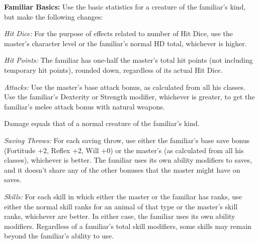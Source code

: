 \textbf{Familiar Basics:} Use the basic statistics for a creature of the familiar's kind, but make the following changes:

\textit{Hit Dice:} For the purpose of effects related to number of Hit Dice, use the master's character level or the familiar's normal HD total, whichever is higher.

\textit{Hit Points:} The familiar has one-half the master's total hit points (not including temporary hit points), rounded down, regardless of its actual Hit Dice.

\textit{Attacks:} Use the master's base attack bonus, as calculated from all his classes. Use the familiar's Dexterity or Strength modifier, whichever is greater, to get the familiar's melee attack bonus with natural weapons.

Damage equals that of a normal creature of the familiar's kind.

\textit{Saving Throws:} For each saving throw, use either the familiar's base save bonus (Fortitude +2, Reflex +2, Will +0) or the master's (as calculated from all his classes), whichever is better. The familiar uses its own ability modifiers to saves, and it doesn't share any of the other bonuses that the master might have on saves.

\textit{Skills:} For each skill in which either the master or the familiar has ranks, use either the normal skill ranks for an animal of that type or the master's skill ranks, whichever are better. In either case, the familiar uses its own ability modifiers. Regardless of a familiar's total skill modifiers, some skills may remain beyond the familiar's ability to use.


